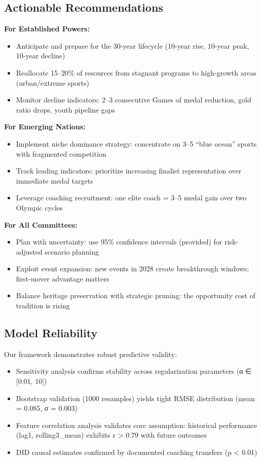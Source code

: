 \documentclass{mcmthesis}
\begin{document}
\subsection*{Actionable Recommendations}

\textbf{For Established Powers:}
\begin{itemize}
    \item Anticipate and prepare for the 30-year lifecycle (10-year rise, 10-year peak, 10-year decline)
    \item Reallocate 15--20\% of resources from stagnant programs to high-growth areas (urban/extreme sports)
    \item Monitor decline indicators: 2--3 consecutive Games of medal reduction, gold ratio drops, youth pipeline gaps
\end{itemize}

\textbf{For Emerging Nations:}
\begin{itemize}
    \item Implement niche dominance strategy: concentrate on 3--5 ``blue ocean'' sports with fragmented competition
    \item Track leading indicators: prioritize increasing finalist representation over immediate medal targets
    \item Leverage coaching recruitment: one elite coach = 3--5 medal gain over two Olympic cycles
\end{itemize}

\textbf{For All Committees:}
\begin{itemize}
    \item Plan with uncertainty: use 95\% confidence intervals (provided) for risk-adjusted scenario planning
    \item Exploit event expansion: new events in 2028 create breakthrough windows; first-mover advantage matters
    \item Balance heritage preservation with strategic pruning: the opportunity cost of tradition is rising
\end{itemize}

\subsection*{Model Reliability}

Our framework demonstrates robust predictive validity:
\begin{itemize}
    \item Sensitivity analysis confirms stability across regularization parameters (α ∈ [0.01, 10])
    \item Bootstrap validation (1000 resamples) yields tight RMSE distribution (mean = 0.085, σ = 0.003)
    \item Feature correlation analysis validates core assumption: historical performance (lag1, rolling3\_mean) exhibits r > 0.79 with future outcomes
    \item DID causal estimates confirmed by documented coaching transfers (p < 0.01)
\end{itemize}
\end{document}
